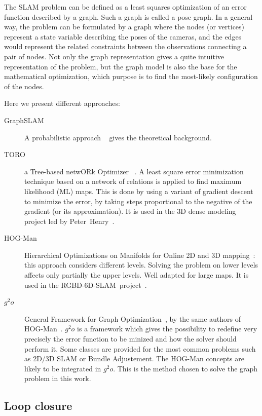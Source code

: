 The \gls{SLAM} problem can be defined as a least squares optimization of an error function described by a graph. Such a graph is called a pose graph. In a general way, the problem can be formulated by a graph where the nodes (or vertices) represent a state variable describing the poses of the cameras, and the edges would represent the related constraints between the observations connecting a pair of nodes. Not only the graph representation gives a quite intuitive representation of the problem, but the graph model is also the base for the mathematical optimization, which purpose is to find the most-likely configuration of the nodes.

Here we present different approaches:

\begin{description}
\item[GraphSLAM] A probabilistic approach ~\cite{Thrun_2005} gives the theoretical background. %
\item[TORO] a Tree-based netwORk Optimizer ~\cite{grisetti07rss}. A least square error minimization technique based on a network of relations is applied to find maximum likelihood (ML) maps. This is done by using a variant of gradient descent to minimize the error, by taking steps proportional to the negative of the gradient (or its approximation). It is used in the 3D dense modeling project led by Peter~Henry~\cite{Intel_RGBD_2010}.
\item[HOG-Man] Hierarchical Optimizations on Manifolds for Online 2D and 3D mapping~\cite{hogman_2010}: this approach considers different levels. Solving the problem on lower levels affects only partially the upper levels. Well adapted for large maps. It is used in the RGBD-6D-SLAM~project~\cite{engelhard11euron-workshop}.
\item[$g^2o$] General Framework for Graph Optimization~\cite{g2o_2011}, by the same authors of HOG-Man~\cite{hogman_2010}. $g^2o$ is a framework which gives the possibility to redefine very precisely the error function to be minized and how the solver should perform it. Some classes are provided for the most common problems such as 2D/3D \gls{SLAM} or Bundle Adjustement. The HOG-Man concepts are likely to be integrated in $g^2o$. This is the method chosen to solve the graph problem in this work.
\end{description}

\subsection{Loop closure}

